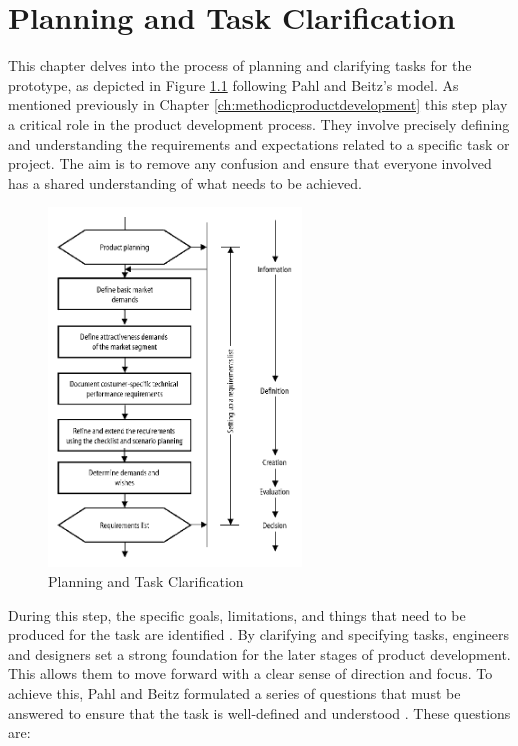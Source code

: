 \chapter{Planning and Task Clarification}

This chapter delves into the process of planning and clarifying tasks for the prototype, as depicted in Figure \ref{fig:planning} following Pahl and Beitz's model. As mentioned previously in Chapter \ref{ch:methodicproductdevelopment} this step play a critical role in the product development process. They involve precisely defining and understanding the requirements and expectations related to a specific task or project. The aim is to remove any confusion and ensure that everyone involved has a shared understanding of what needs to be achieved.

\begin{figure}[ht!]
    \centering
    \includegraphics[width=0.6\textwidth]{texs/Part1/chapter2/image/planning.png}
    \caption{Planning and Task Clarification \cite{Pahl07m}}
    \label{fig:planning}
\end{figure}

During this step, the specific goals, limitations, and things that need to be produced for the task are identified \cite{Pahl07a}. By clarifying and specifying tasks, engineers and designers set a strong foundation for the later stages of product development. This allows them to move forward with a clear sense of direction and focus. To achieve this, Pahl and Beitz formulated a series of questions that must be answered to ensure that the task is well-defined and understood \cite{Pahl07a}. These questions are:

